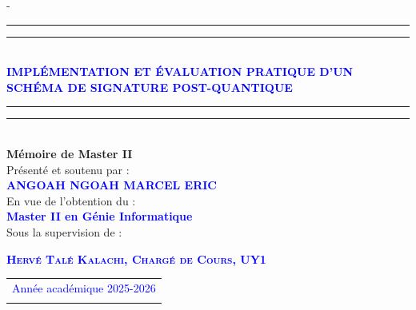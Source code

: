 \begin{titlingpage}
\begin{SingleSpace}
\begin{adjustwidth*}{\unitlength}{-\unitlength}
\begin{center}
\end{center}
\hspace{3cm}
\vspace{0.3cm}
\begin{center}
\rule[0.5ex]{\linewidth}{2pt}\vspace*{-\baselineskip}\vspace*{3.2pt}
\rule[0.6ex]{\linewidth}{1pt}\\[\baselineskip]
{\Large {\textcolor{blue}{\textsc{ \textbf{IMPLÉMENTATION ET ÉVALUATION PRATIQUE
D'UN SCHÉMA DE SIGNATURE POST-QUANTIQUE
} }}
} }\\
\rule[0.5ex]{\linewidth}{1pt}\vspace*{-\baselineskip}\vspace{3.2pt}
\rule[0.5ex]{\linewidth}{2pt}\\
\vspace{4mm}
{\Large \textbf{Mémoire de Master II}}\\
\vspace{4mm}
{\Large Présenté et soutenu par : } \\
\vspace{4mm}
{\large \textsc{\textbf{\textcolor{blue}{ANGOAH NGOAH MARCEL ERIC}}}}\\
\vspace{4mm}
{\Large En vue de l'obtention du :} \\
\vspace{4mm}
{\large \textbf{\textcolor{blue}{Master II en Génie Informatique}}}\\
\vspace{4mm}
{\Large Sous la supervision de :}\\
\vspace{4mm}

{\normalsize \textsc{\textbf{\textcolor{blue}{Hervé Talé Kalachi, Chargé de Cours, UY1}}}}\
\vspace{4mm}

\vspace{6mm}

\vspace{3mm}


\begin{tabular}{c}
{\Large \textcolor{blue}{Année académique 2025-2026}}\\ \\

\end{tabular}


\end{center}
\end{adjustwidth*}
\end{SingleSpace}
\end{titlingpage}
